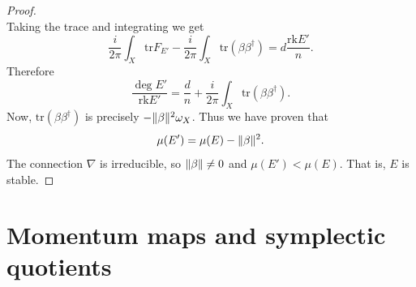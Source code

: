 \documentclass[12pt,a4paper]{book}
\theoremstyle{definition} \newtheorem{defn}[thm]{Definition}
\theoremstyle{definition} \newtheorem{ejemplo}[thm]{Example}
\theoremstyle{remark} \newtheorem{rem}[thm]{Remark}
\def\tr{\mathrm{tr}}
\def\rk{\mathrm{rk}}
\DeclarePairedDelimiter\norm{\lVert}{\rVert}
\begin{document}
\begin{proof}
\begin{equation*}
\end{equation*}
Taking the trace and integrating we get
\begin{equation*}
  \frac{i}{2\pi}\int_X \tr F_{E'} - \frac{i}{2\pi} \int_X \tr(\beta \beta^\dagger) = d\frac{\rk E'}{n}.
\end{equation*}
Therefore
\begin{equation*}
  \frac{\deg E'}{ \rk E'} = \frac{d}{n} + \frac{i}{2\pi} \int_X \tr(\beta \beta^\dagger).
\end{equation*}
Now, $\tr(\beta\beta^\dagger)$ is precisely $- \norm{\beta}^2 \omega_X$. Thus we have proven that 
\begin{equation*}
\mu(E')= \mu(E) - \norm{\beta}^2 .
\end{equation*}
The connection $\nabla$ is irreducible, so $\norm{\beta}\neq 0$ and $\mu(E')< \mu(E)$. That is, $E$ is stable.
\end{proof}

\newpage\null\thispagestyle{empty}
\chapter{Momentum maps and symplectic quotients}
\end{document}
